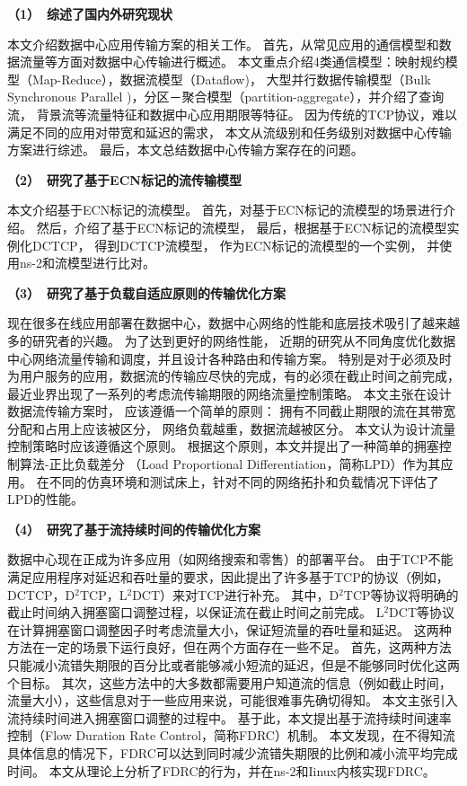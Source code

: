 \textbf{（1）~综述了国内外研究现状}

本文介绍数据中心应用传输方案的相关工作。
首先，从常见应用的通信模型和数据流量等方面对数据中心传输进行概述。
本文重点介绍4类通信模型：映射规约模型（Map-Reduce），数据流模型（Dataflow)，
大型并行数据传输模型（Bulk Synchronous Parallel )，分区－聚合模型（partition-aggregate），并介绍了查询流，
背景流等流量特征和数据中心应用期限等特征。
因为传统的TCP协议，难以满足不同的应用对带宽和延迟的需求，
本文从流级别和任务级别对数据中心传输方案进行综述。
最后，本文总结数据中心传输方案存在的问题。

\textbf{（2）~研究了基于ECN标记的流传输模型}

本文介绍基于ECN标记的流模型。
首先，对基于ECN标记的流模型的场景进行介绍。
然后，介绍了基于ECN标记的流模型，
最后，根据基于ECN标记的流模型实例化DCTCP，
得到DCTCP流模型，
作为ECN标记的流模型的一个实例，
并使用ns-2和流模型进行比对。

\textbf{（3）~研究了基于负载自适应原则的传输优化方案 }

现在很多在线应用部署在数据中心，数据中心网络的性能和底层技术吸引了越来越多的研究者的兴趣。
为了达到更好的网络性能，
近期的研究从不同角度优化数据中心网络流量传输和调度，并且设计各种路由和传输方案。
特别是对于必须及时为用户服务的应用，数据流的传输应尽快的完成，有的必须在截止时间之前完成，
最近业界出现了一系列的考虑流传输期限的网络流量控制策略。
本文主张在设计数据流传输方案时，
应该遵循一个简单的原则：
拥有不同截止期限的流在其带宽分配和占用上应该被区分，
网络负载越重，数据流越被区分。
本文认为设计流量控制策略时应该遵循这个原则。
根据这个原则，本文并提出了一种简单的拥塞控制算法-正比负载差分
（Load Proportional Differentiation，简称LPD）作为其应用。
在不同的仿真环境和测试床上，针对不同的网络拓扑和负载情况下评估了LPD的性能。

\textbf{（4）~研究了基于流持续时间的传输优化方案}

数据中心现在正成为许多应用（如网络搜索和零售）的部署平台。
由于TCP不能满足应用程序对延迟和吞吐量的要求，因此提出了许多基于TCP的协议（例如，DCTCP，D$^2$TCP，L$^2$DCT）来对TCP进行补充。
其中，D$^2$TCP等协议将明确的截止时间纳入拥塞窗口调整过程，以保证流在截止时间之前完成。
L$^2$DCT等协议在计算拥塞窗口调整因子时考虑流量大小，保证短流量的吞吐量和延迟。
这两种方法在一定的场景下运行良好，但在两个方面存在一些不足。
首先，这两种方法只能减小流错失期限的百分比或者能够减小短流的延迟，但是不能够同时优化这两个目标。
其次，这些方法中的大多数都需要用户知道流的信息（例如截止时间，流量大小），这些信息对于一些应用来说，可能很难事先确切得知。
本文主张引入流持续时间进入拥塞窗口调整的过程中。
基于此，本文提出基于流持续时间速率控制（Flow Duration Rate Control，简称FDRC）机制。
本文发现，在不得知流具体信息的情况下，FDRC可以达到同时减少流错失期限的比例和减小流平均完成时间。
本文从理论上分析了FDRC的行为，并在ns-2和Iinux内核实现FDRC。

